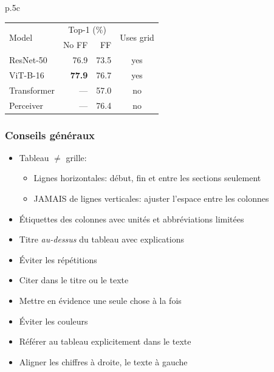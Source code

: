 \documentclass[aspectratio=169]{beamer}
\begin{document}
\begin{frame}[c]
\begin{tabular}{p{}c}
{\begin{minipage}{.4\textwidth}
\begin{table}
\vspace{3pt}
\begin{tabular}{l@{\hskip5pt}r@{\hskip10pt}r@{\hskip5pt}c}
\toprule
\multirow{2}{*}[-2pt]{Model} & \multicolumn{2}{c}{Top\hspace{1pt}-\hspace{-1.08pt}1 (\%)} & \multirow{2}{*}[-2pt]{Uses grid}\\
\cmidrule(r){2-3}
 & No FF & FF & \\
\midrule
ResNet-50 & 76.9 & 73.5 & yes\\
ViT-B-16 & \textbf{77.9} & 76.7 & yes\\
Transformer & --- & 57.0 & no\\
Perceiver & --- & 76.4 & no\\
\bottomrule
\end{tabular}
\end{table}
\end{minipage}
}

\end{tabular}



\end{frame}


\begin{frame}[c]\frametitle{Conseils généraux}

\vspace{-4mm}

\begin{itemize}
	\item<+-> Tableau $\ne$ grille:
	\begin{itemize}
		\item Lignes horizontales: début, fin et entre les sections seulement
		\item JAMAIS de lignes verticales: ajuster l'espace entre les colonnes
	\end{itemize}
	\vspace{-3mm}
	\item<+-> Étiquettes des colonnes avec unités et abbréviations limitées
	\item<+-> Titre \textit{au-dessus} du tableau avec explications
	\item<+-> Éviter les répétitions
	\item<+-> Citer dans le titre ou le texte
	\item<+-> Mettre en évidence une seule chose à la fois
	\item<+-> Éviter les couleurs
	\item<+-> Référer au tableau explicitement dans le texte
	\item<+-> Aligner les chiffres à droite, le texte à gauche
\end{itemize}

\end{frame}
\end{document}

